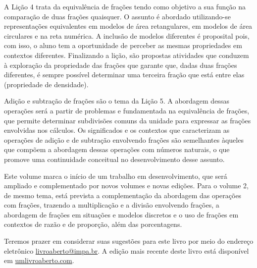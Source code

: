 A Lição 4 trata da equivalência de frações tendo como objetivo a sua função na comparação de duas frações quaisquer. O assunto é abordado utilizando-se representações equivalentes em modelos de área retangulares, em modelos de área circulares e na reta numérica. A inclusão de modelos diferentes é proposital pois, com isso, o aluno tem a oportunidade de perceber as mesmas propriedades em contextos diferentes. Finalizando a lição, são propostas atividades que conduzem à exploração da propriedade das frações que garante que, dadas duas frações diferentes, é sempre possível determinar uma terceira fração que está entre elas (propriedade de densidade).

Adição e subtração de frações são o tema da Lição 5.
A abordagem dessas operações será a partir de problemas e fundamentada na equivalência de frações, que permite determinar subdivisões comuns da unidade para expressar as frações envolvidas nos cálculos.
Os significados e os contextos que caracterizam as operações de adição e de subtração ​envolvendo frações são semelhantes àqueles que compõem a abordagem dessas operações com números naturais, ​o que ​promove​​ uma continuidade conceitual ​no desenvolvimento desse assunto.

Este volume marca o início de um trabalho em desenvolvimento, que será ampliado e complementado por novos volumes e novas edições. Para o volume 2, de mesmo tema, está prevista a complementação da abordagem das operações com frações, trazendo a multiplicação e a divisão envolvendo frações, a abordagem de frações em situações e modelos discretos e o uso de frações em contextos de razão e de proporção, além das porcentagens.


Teremos prazer em considerar suas sugestões para este livro por meio do endereço eletrônico \textcolor{blue}{\url{livroaberto@impa.br}}.
A edição mais recente deste livro está disponível em \textcolor{blue}{\url{umlivroaberto.com}}.
